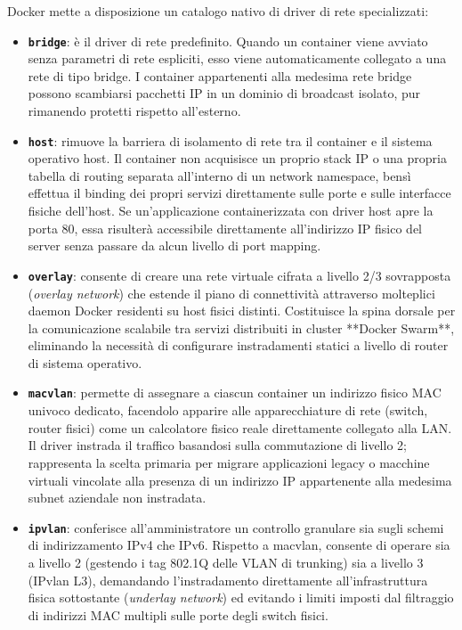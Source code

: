 \documentclass[11pt, a4paper]{article}
\begin{document}
Docker mette a disposizione un catalogo nativo di driver di rete specializzati:

\begin{itemize}
    \item \textbf{\texttt{bridge}}: è il driver di rete predefinito. Quando un container viene avviato senza parametri di rete espliciti, esso viene automaticamente collegato a una rete di tipo bridge. I container appartenenti alla medesima rete bridge possono scambiarsi pacchetti IP in un dominio di broadcast isolato, pur rimanendo protetti rispetto all'esterno.
    \item \textbf{\texttt{host}}: rimuove la barriera di isolamento di rete tra il container e il sistema operativo host. Il container non acquisisce un proprio stack IP o una propria tabella di routing separata all'interno di un network namespace, bensì effettua il binding dei propri servizi direttamente sulle porte e sulle interfacce fisiche dell'host. Se un'applicazione containerizzata con driver host apre la porta 80, essa risulterà accessibile direttamente all'indirizzo IP fisico del server senza passare da alcun livello di port mapping.
    \item \textbf{\texttt{overlay}}: consente di creare una rete virtuale cifrata a livello 2/3 sovrapposta (\emph{overlay network}) che estende il piano di connettività attraverso molteplici daemon Docker residenti su host fisici distinti. Costituisce la spina dorsale per la comunicazione scalabile tra servizi distribuiti in cluster **Docker Swarm**, eliminando la necessità di configurare instradamenti statici a livello di router di sistema operativo.
    \item \textbf{\texttt{macvlan}}: permette di assegnare a ciascun container un indirizzo fisico MAC univoco dedicato, facendolo apparire alle apparecchiature di rete (switch, router fisici) come un calcolatore fisico reale direttamente collegato alla LAN. Il driver instrada il traffico basandosi sulla commutazione di livello 2; rappresenta la scelta primaria per migrare applicazioni legacy o macchine virtuali vincolate alla presenza di un indirizzo IP appartenente alla medesima subnet aziendale non instradata.
    \item \textbf{\texttt{ipvlan}}: conferisce all'amministratore un controllo granulare sia sugli schemi di indirizzamento IPv4 che IPv6. Rispetto a macvlan, consente di operare sia a livello 2 (gestendo i tag 802.1Q delle VLAN di trunking) sia a livello 3 (IPvlan L3), demandando l'instradamento direttamente all'infrastruttura fisica sottostante (\emph{underlay network}) ed evitando i limiti imposti dal filtraggio di indirizzi MAC multipli sulle porte degli switch fisici.

\end{itemize}
\end{document}
